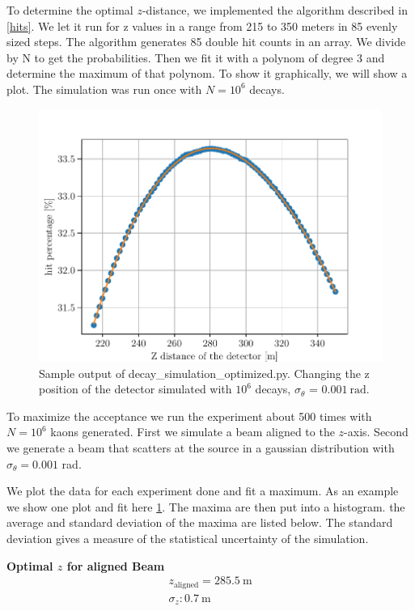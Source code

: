 \documentclass[12pt,a4paper,oneside,english]{article}
\begin{document}
	
	To determine the optimal $z$-distance, we implemented the algorithm described in \ref{hits}. We let it run for z values in a range from 215 to 350 meters in 85 evenly sized steps. The algorithm generates 85 double hit counts in an array. We divide by N to get the probabilities. Then we fit it with a polynom of degree 3 and determine the maximum of that polynom. To show it graphically, we will show a plot. The simulation was run once with $N = 10^6 $ decays.
	
\begin{figure}
	\centering
	\includegraphics[width=0.8\linewidth]{images/sample_figure_1000000.pdf}
	\caption{Sample output of decay\_simulation\_optimized.py. Changing the z position of the detector simulated with $10^6$ decays, $\sigma_{\theta}$ = $\SI{0.001}{\radian}$.}
	\label{fig:decay_simulation}
\end{figure}
	
		To maximize the acceptance we run the experiment about 500 times with $N = 10^6 $ kaons generated. First we simulate a beam aligned to the $z$-axis. Second we generate a beam that scatters at the source in a gaussian distribution with $\sigma _{\theta} = 0.001$ rad. 
		
		We plot the data for each experiment done and fit a maximum. As an example we show one plot and fit here \ref*{fig:decay_simulation}. The maxima are then put into a histogram.  the average and standard deviation of the maxima are listed below. The standard deviation gives a measure of the statistical uncertainty of the simulation.
	
	\textbf{Optimal $z$ for aligned Beam}
		\begin{align*}
		 z_{\text{aligned}} = \SI{285.5}{\meter}\\
		\sigma _z  : \SI{0.7}{\meter}\\
		\end{align*}
	
\end{document}
